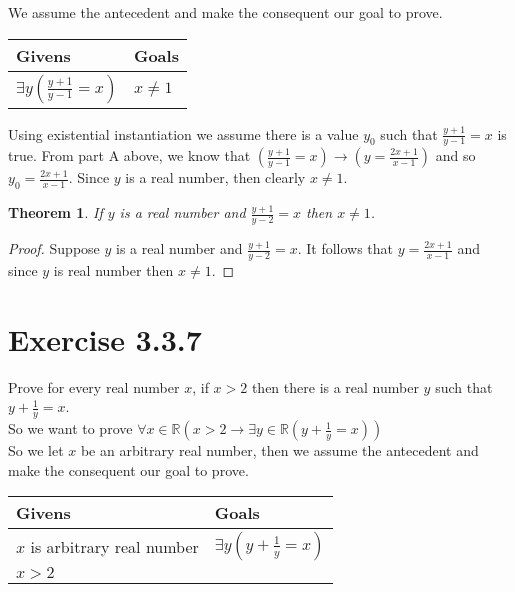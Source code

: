 \documentclass{article}
\newcommand{\n}{ \noindent }
\newtheorem*{theorem}{Theorem}  %
\begin{document}
\n We assume the antecedent and make the consequent our goal to prove. \\

\begin{table}[h]
\begin{tabular}{ll}
\hline
Givens & Goals   \\ \hline
$\exists y \left(\frac{y+1}{y-1} = x \right)$ & $x \neq 1$   \\ \hline
\end{tabular}
\end{table}


\n Using existential instantiation we assume there is a value $y_0$ such that $ \tfrac{y+1}{y-1} = x$ is true. From part A above, we know that $\left(\frac{y+1}{y-1} = x \right) \rightarrow \left( y = \tfrac{2x+1}{x-1} \right)$ and so $y_0 = \tfrac{2x+1}{x-1}$. Since $y$ is a real number, then clearly $x \neq 1$.

\begin{theorem} If $y$ is a real number and $\tfrac{y+1}{y-2} = x$ then $x \neq 1$.
\end{theorem}
\begin{proof}
Suppose $y$ is a real number and $\tfrac{y+1}{y-2} = x$. It follows that $y = \tfrac{2x+1}{x-1}$ and since $y$ is real number then $x \neq 1$.
\end{proof}

\section*{Exercise 3.3.7}
Prove for every real number $x$, if $x>2$ then there is a real number $y$ such that $y + \tfrac{1}{y} = x$. \\

\n So we want to prove
$\forall x \in \mathbb{R}(x>2 \rightarrow \exists y \in \mathbb{R}(y + \tfrac{1}{y} = x))$ \\

\n So we let $x$ be an arbitrary real number, then we assume the antecedent and make the consequent our goal to prove. \\

\begin{table}[h]
\begin{tabular}{ll}
\hline
Givens & Goals   \\ \hline
$x$ is arbitrary real number & $\exists y (y + \tfrac{1}{y} = x)$   \\ 
$x > 2$  & \\ \hline
\end{tabular}
\end{table}
\end{document}
